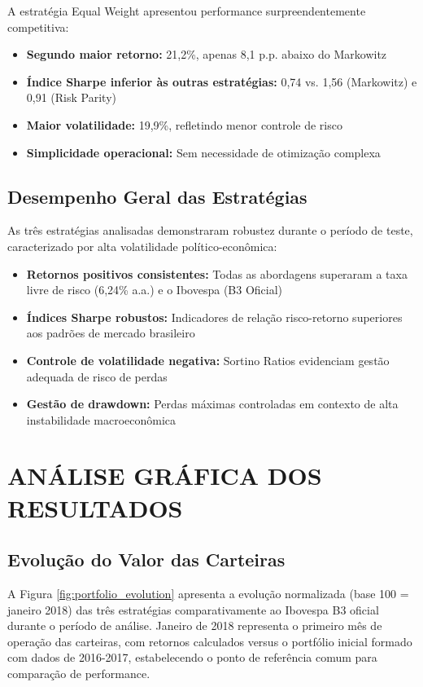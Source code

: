 A estratégia Equal Weight apresentou performance surpreendentemente competitiva:

\begin{itemize}
    \item \textbf{Segundo maior retorno:} 21,2\%, apenas 8,1 p.p. abaixo do Markowitz
    \item \textbf{Índice Sharpe inferior às outras estratégias:} 0,74 vs. 1,56 (Markowitz) e 0,91 (Risk Parity)
    \item \textbf{Maior volatilidade:} 19,9\%, refletindo menor controle de risco
    \item \textbf{Simplicidade operacional:} Sem necessidade de otimização complexa
\end{itemize}

\subsection{Desempenho Geral das Estratégias}

As três estratégias analisadas demonstraram robustez durante o período de teste, caracterizado por alta volatilidade político-econômica:

\begin{itemize}
    \item \textbf{Retornos positivos consistentes:} Todas as abordagens superaram a taxa livre de risco (6,24\% a.a.) e o Ibovespa (B3 Oficial)
    \item \textbf{Índices Sharpe robustos:} Indicadores de relação risco-retorno superiores aos padrões de mercado brasileiro
    \item \textbf{Controle de volatilidade negativa:} Sortino Ratios evidenciam gestão adequada de risco de perdas
    \item \textbf{Gestão de drawdown:} Perdas máximas controladas em contexto de alta instabilidade macroeconômica
\end{itemize}

\section{ANÁLISE GRÁFICA DOS RESULTADOS}

\subsection{Evolução do Valor das Carteiras}

A Figura \ref{fig:portfolio_evolution} apresenta a evolução normalizada (base 100 = janeiro 2018) das três estratégias comparativamente ao Ibovespa B3 oficial durante o período de análise. Janeiro de 2018 representa o primeiro mês de operação das carteiras, com retornos calculados versus o portfólio inicial formado com dados de 2016-2017, estabelecendo o ponto de referência comum para comparação de performance.

